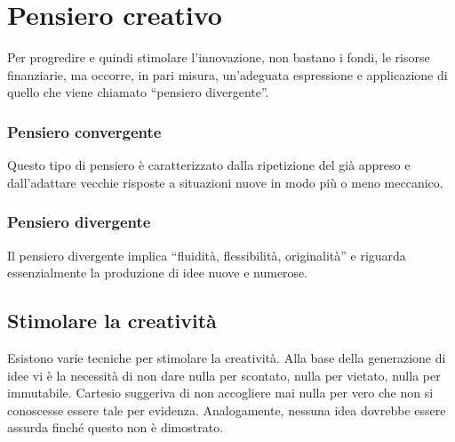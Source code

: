 \section{Pensiero creativo}
Per progredire e quindi stimolare l’innovazione, non bastano i fondi, le risorse finanziarie, ma occorre, in pari misura, un’adeguata espressione e applicazione di quello che viene chiamato “pensiero divergente”.

\subsubsection*{Pensiero convergente}
Questo tipo di pensiero è caratterizzato dalla ripetizione del già appreso e dall’adattare vecchie risposte a situazioni nuove in modo più o meno meccanico.

\subsubsection*{Pensiero divergente}
Il pensiero divergente implica “fluidità, flessibilità, originalità” e riguarda essenzialmente la produzione di idee nuove e numerose.

\subsection*{Stimolare la creatività}
Esistono varie tecniche per stimolare la creatività. \newline
Alla base della generazione di idee vi è la  necessità di non dare nulla per scontato, nulla per vietato, nulla per immutabile. Cartesio suggeriva di non accogliere mai nulla per vero che non si conoscesse essere tale per evidenza. Analogamente, nessuna idea dovrebbe essere assurda finché questo non è dimostrato.

